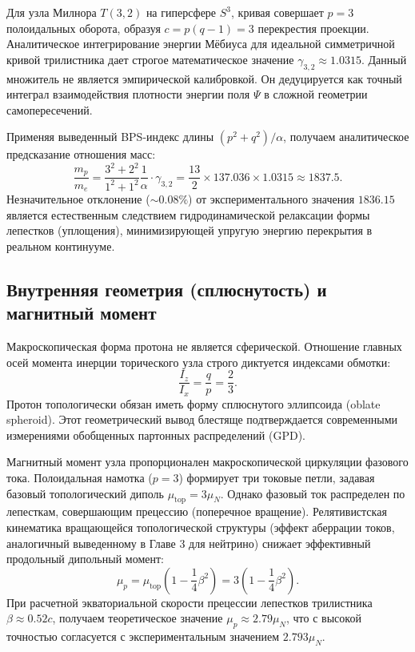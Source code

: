 \documentclass[12pt,a4paper]{article}
\begin{document}
Для узла Милнора $T(3,2)$ на гиперсфере $S^3$, кривая совершает $p=3$ полоидальных оборота, образуя $c = p(q-1) = 3$ перекрестия проекции. Аналитическое интегрирование энергии Мёбиуса для идеальной симметричной кривой трилистника дает строгое математическое значение $\gamma_{3,2} \approx 1.0315$. 
Данный множитель не является эмпирической калибровкой. Он дедуцируется как точный интеграл взаимодействия плотности энергии поля $\Psi$ в сложной геометрии самопересечений.

Применяя выведенный BPS-индекс длины $(p^2+q^2)/\alpha$, получаем аналитическое предсказание отношения масс:
\begin{equation}
\frac{m_p}{m_e} = \frac{3^2 + 2^2}{1^2 + 1^2} \frac{1}{\alpha} \cdot \gamma_{3,2} = \frac{13}{2} \times 137.036 \times 1.0315 \approx 1837.5.
\end{equation}
Незначительное отклонение ($\sim 0.08\%$) от экспериментального значения $1836.15$ является естественным следствием гидродинамической релаксации формы лепестков (уплощения), минимизирующей упругую энергию перекрытия в реальном континууме.

\subsection{Внутренняя геометрия (сплюснутость) и магнитный момент}
Макроскопическая форма протона не является сферической. Отношение главных осей момента инерции торического узла строго диктуется индексами обмотки:
\begin{equation}
\frac{I_z}{I_x} = \frac{q}{p} = \frac{2}{3}.
\end{equation}
Протон топологически обязан иметь форму сплюснутого эллипсоида (oblate spheroid). Этот геометрический вывод блестяще подтверждается современными измерениями обобщенных партонных распределений (GPD).

Магнитный момент узла пропорционален макроскопической циркуляции фазового тока. Полоидальная намотка ($p=3$) формирует три токовые петли, задавая базовый топологический диполь $\mu_{\text{top}} = 3 \mu_N$.
Однако фазовый ток распределен по лепесткам, совершающим прецессию (поперечное вращение). Релятивистская кинематика вращающейся топологической структуры (эффект аберрации токов, аналогичный выведенному в Главе 3 для нейтрино) снижает эффективный продольный дипольный момент:
\begin{equation}
\mu_p = \mu_{\text{top}} \left(1 - \frac{1}{4}\beta^2\right) = 3 \left(1 - \frac{1}{4}\beta^2\right).
\end{equation}
При расчетной экваториальной скорости прецессии лепестков трилистника $\beta \approx 0.52 c$, получаем теоретическое значение $\mu_p \approx 2.79 \mu_N$, что с высокой точностью согласуется с экспериментальным значением $2.793 \mu_N$.
\end{document}
